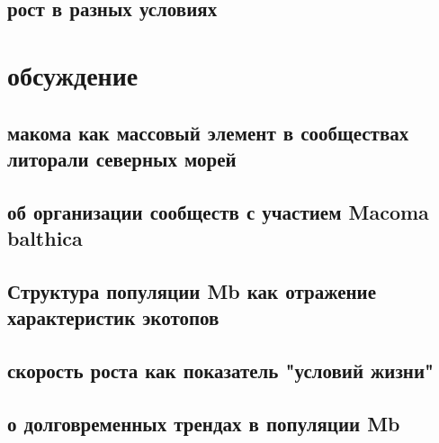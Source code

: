 \documentclass[12pt, a4paper]{article}
\begin{document}
        \subsection{рост в разных условиях}

\section{обсуждение}

        \subsection{макома как массовый элемент в сообществах литорали северных морей}

        \subsection{об организации сообществ с участием Macoma balthica}

        \subsection{Структура популяции Mb как отражение характеристик экотопов}

        \subsection{скорость роста как показатель "условий жизни"}

        \subsection{о долговременных трендах в популяции Mb}
\end{document}
